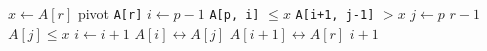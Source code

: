 \begin{codebox}
\li $x \gets A[r]$ 
	\Comment pivot \texttt{A[r]}
\li $i \gets p - 1$
\zi \Comment \texttt{A[p, i]} $\leq x$
\zi \Comment \texttt{A[i+1, j-1]} $> x$
\li \For $j \gets p$ \To $r-1$
\li 	\Do
			\If $A[j] \leq x$
\li 			\Then
					$i \gets i + 1$
\li 				$A[i] \leftrightarrow A[j]$
				\End
		\End
\li $A[i+1] \leftrightarrow A[r]$
\li \Return $i + 1$
\end{codebox}